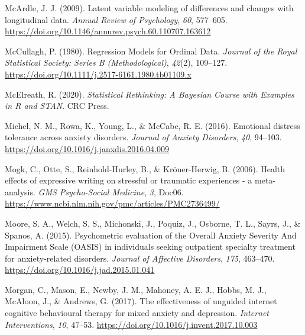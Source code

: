 \documentclass[
  man,floatsintext]{apa7}
\newlength{\cslhangindent}
\newlength{\cslentryspacingunit} %
\newenvironment{CSLReferences}[2] %
 {%
  \setlength{\parindent}{0pt}
  \ifodd #1
  \let\oldpar\par
  \def\par{\hangindent=\cslhangindent\oldpar}
  \fi
  \setlength{\parskip}{#2\cslentryspacingunit}
 }%
 {}
\begin{document}
\begin{CSLReferences}{1}{0}
\leavevmode{}%
McArdle, J. J. (2009). Latent variable modeling of differences and changes with longitudinal data. \emph{Annual Review of Psychology}, \emph{60}, 577--605. \url{https://doi.org/10.1146/annurev.psych.60.110707.163612}

\leavevmode{}%
McCullagh, P. (1980). Regression Models for Ordinal Data. \emph{Journal of the Royal Statistical Society: Series B (Methodological)}, \emph{42}(2), 109--127. \url{https://doi.org/10.1111/j.2517-6161.1980.tb01109.x}

\leavevmode{}%
McElreath, R. (2020). \emph{Statistical Rethinking: A Bayesian Course with Examples in R and STAN}. CRC Press.

\leavevmode{}%
Michel, N. M., Rowa, K., Young, L., \& McCabe, R. E. (2016). Emotional distress tolerance across anxiety disorders. \emph{Journal of Anxiety Disorders}, \emph{40}, 94--103. \url{https://doi.org/10.1016/j.janxdis.2016.04.009}

\leavevmode{}%
Mogk, C., Otte, S., Reinhold-Hurley, B., \& Kröner-Herwig, B. (2006). Health effects of expressive writing on stressful or traumatic experiences - a meta-analysis. \emph{GMS Psycho-Social Medicine}, \emph{3}, Doc06. \url{https://www.ncbi.nlm.nih.gov/pmc/articles/PMC2736499/}

\leavevmode{}%
Moore, S. A., Welch, S. S., Michonski, J., Poquiz, J., Osborne, T. L., Sayrs, J., \& Spanos, A. (2015). Psychometric evaluation of the Overall Anxiety Severity And Impairment Scale (OASIS) in individuals seeking outpatient specialty treatment for anxiety-related disorders. \emph{Journal of Affective Disorders}, \emph{175}, 463--470. \url{https://doi.org/10.1016/j.jad.2015.01.041}

\leavevmode{}%
Morgan, C., Mason, E., Newby, J. M., Mahoney, A. E. J., Hobbs, M. J., McAloon, J., \& Andrews, G. (2017). The effectiveness of unguided internet cognitive behavioural therapy for mixed anxiety and depression. \emph{Internet Interventions}, \emph{10}, 47--53. \url{https://doi.org/10.1016/j.invent.2017.10.003}


\end{CSLReferences}
\end{document}
